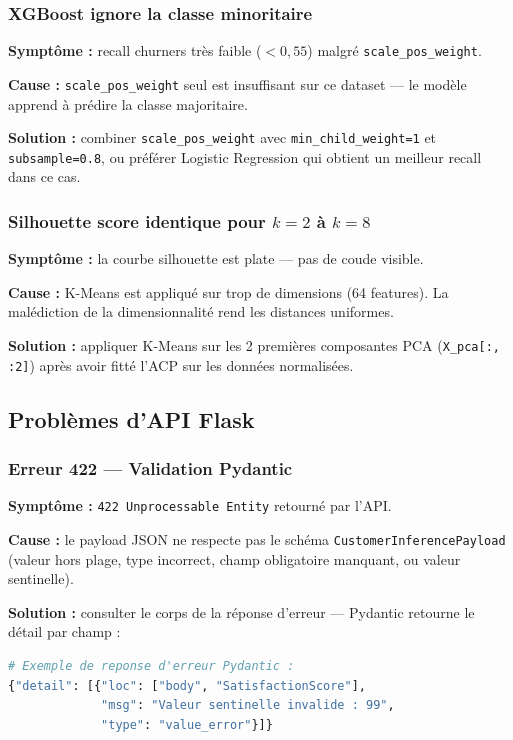 \documentclass[11pt,a4paper]{article}
\begin{document}
\subsubsection{XGBoost ignore la classe minoritaire}

\textbf{Symptôme :} recall churners très faible ($< 0{,}55$) malgré \texttt{scale\_pos\_weight}.

\textbf{Cause :} \texttt{scale\_pos\_weight} seul est insuffisant sur ce dataset — le modèle apprend à prédire la classe majoritaire.

\textbf{Solution :} combiner \texttt{scale\_pos\_weight} avec \texttt{min\_child\_weight=1} et \texttt{subsample=0.8}, ou préférer Logistic Regression qui obtient un meilleur recall dans ce cas.

\subsubsection{Silhouette score identique pour $k=2$ à $k=8$}

\textbf{Symptôme :} la courbe silhouette est plate — pas de coude visible.

\textbf{Cause :} K-Means est appliqué sur trop de dimensions (64 features). La malédiction de la dimensionnalité rend les distances uniformes.

\textbf{Solution :} appliquer K-Means sur les 2 premières composantes PCA (\texttt{X\_pca[:, :2]}) après avoir fitté l'ACP sur les données normalisées.

\subsection{Problèmes d'API Flask}

\subsubsection{Erreur 422 — Validation Pydantic}

\textbf{Symptôme :} \texttt{422 Unprocessable Entity} retourné par l'API.

\textbf{Cause :} le payload JSON ne respecte pas le schéma \texttt{CustomerInferencePayload} (valeur hors plage, type incorrect, champ obligatoire manquant, ou valeur sentinelle).

\textbf{Solution :} consulter le corps de la réponse d'erreur — Pydantic retourne le détail par champ :
\begin{lstlisting}[language=bash, numbers=none]
# Exemple de reponse d'erreur Pydantic :
{"detail": [{"loc": ["body", "SatisfactionScore"],
             "msg": "Valeur sentinelle invalide : 99",
             "type": "value_error"}]}
\end{lstlisting}
\end{document}
